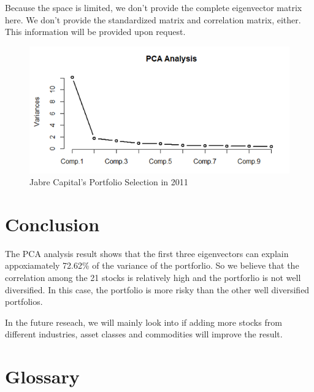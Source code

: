 \documentclass[oneside,12pt]{report}
\begin{document}
Because the space is limited, we don't provide the complete eigenvector matrix here. We don't provide the standardized matrix and correlation matrix, either. This information will be provided upon request.
\begin{figure}[ht]
    \begin{center}
        \includegraphics[width=\textwidth]{5.png}
    \end{center}
    \caption{Jabre Capital's Portfolio Selection in 2011}
    \label{fig:eigenvector}
\end{figure}


\chapter{Conclusion}\label{Conclusion}
The PCA analysis result shows that the first three eigenvectors can explain appoxiamately 72.62\% of the variance of the portforlio. So we believe that the correlation among the 21 stocks is relatively high and the portforlio is not well diversified. In this case, the portfolio is more risky than the other well diversified portfolios. 

In the future reseach, we will mainly look into if adding more stocks from different industries, asset classes and commodities will improve the result.

%
%
%
%
%
%


\appendix
{}


\chapter{Glossary}\label{Glossary}
\end{document}
